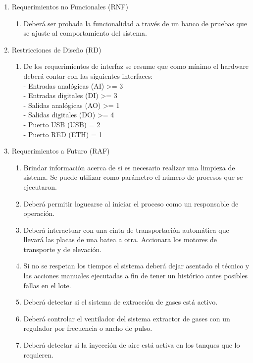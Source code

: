 \begin{enumerate}
\item Requerimientos no Funcionales (RNF)
\begin{enumerate}
\item Deberá ser probada la funcionalidad a través de un banco de pruebas que se ajuste al comportamiento del sistema.
\end{enumerate}
\item Restricciones de Diseño (RD)
\begin{enumerate}
\item De los requerimientos de interfaz se resume que como mínimo el hardware deberá contar con las siguientes interfaces:\\
- Entradas analógicas (AI) >= 3	\\
- Entradas digitales (DI) >= 3	\\
- Salidas analógicas (AO) >= 1	\\
- Salidas digitales (DO) >= 4	\\
- Puerto USB (USB) = 2	\\
- Puerto RED (ETH) = 1	\\
\end{enumerate}
\item Requerimientos a Futuro (RAF)
\begin{enumerate}
\item Brindar información acerca de si es necesario realizar una limpieza de sistema. Se puede utilizar como parámetro el número de procesos que se ejecutaron. 	 	 	
\item Deberá permitir loguearse al iniciar el proceso como un responsable de operación.
\item Deberá interactuar con una cinta de transportación automática que llevará las placas de una batea a otra. Accionara los motores de transporte y de elevación.
\item Si no se respetan los tiempos el sistema deberá dejar asentado el técnico y las acciones manuales ejecutadas a fin de tener un histórico antes posibles fallas en el lote.
\item Deberá detectar si el sistema de extracción de gases está activo.
\item Deberá controlar el ventilador del sistema extractor de gases con un regulador por frecuencia o ancho de pulso.
\item Deberá detectar si la inyección de aire está activa en los tanques que lo requieren.
\end{enumerate}
\end{enumerate}


